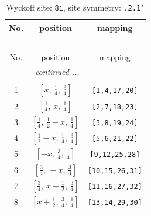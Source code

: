 \documentclass[fleqn,8pt]{jsarticle}
\begin{document}
\begin{longtable}{ccc}
\caption{Wyckoff site: {\tt 8i}, site symmetry: {\tt .2.1'}}
 \\
 \hline \hline
No. & position & mapping \\ \hline \endfirsthead

\multicolumn{2}{l}{\tablename\ \thetable{}} \\
 \hline \hline
No. & position & mapping \\ \hline \endhead

 \hline \hline
\multicolumn{2}{r}{\footnotesize\it continued ...} \\ \endfoot

 \hline \hline
\multicolumn{2}{r}{} \\ \endlastfoot

1 & $\left[ x,\, \frac{1}{4},\, \frac{3}{4} \right]$ & {\tt [1,4,17,20]} \\ \hline
2 & $\left[ \frac{1}{4},\, x,\, \frac{1}{4} \right]$ & {\tt [2,7,18,23]} \\ \hline
3 & $\left[ \frac{1}{4},\, \frac{1}{2} - x,\, \frac{1}{4} \right]$ & {\tt [3,8,19,24]} \\ \hline
4 & $\left[ \frac{1}{2} - x,\, \frac{1}{4},\, \frac{3}{4} \right]$ & {\tt [5,6,21,22]} \\ \hline
5 & $\left[ - x,\, \frac{3}{4},\, \frac{1}{4} \right]$ & {\tt [9,12,25,28]} \\ \hline
6 & $\left[ \frac{3}{4},\, - x,\, \frac{3}{4} \right]$ & {\tt [10,15,26,31]} \\ \hline
7 & $\left[ \frac{3}{4},\, x + \frac{1}{2},\, \frac{3}{4} \right]$ & {\tt [11,16,27,32]} \\ \hline
8 & $\left[ x + \frac{1}{2},\, \frac{3}{4},\, \frac{1}{4} \right]$ & {\tt [13,14,29,30]} \\
\end{longtable}
\renewcommand{\arraystretch}{1.2}
\end{document}
